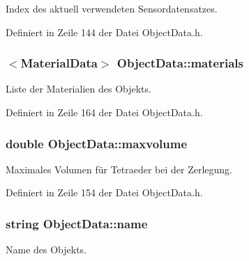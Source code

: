 Index des aktuell verwendeten Sensordatensatzes. 



Definiert in Zeile 144 der Datei Object\-Data.\-h.

\hypertarget{classObjectData_a353002eeb054efed800db1b798d08a6c}{
\subsubsection[{materials}]{$<${\bf Material\-Data}$>$ Object\-Data\-::materials\hspace{0.3cm}{\ttfamily [private]}}}\label{classObjectData_a353002eeb054efed800db1b798d08a6c}


Liste der Materialien des Objekts. 



Definiert in Zeile 164 der Datei Object\-Data.\-h.

\hypertarget{classObjectData_a5cc67da17022ec0f6eed6d02fa975a8b}{
\subsubsection[{maxvolume}]{\setlength{\rightskip}{0pt plus 5cm}double Object\-Data\-::maxvolume\hspace{0.3cm}{\ttfamily [private]}}}\label{classObjectData_a5cc67da17022ec0f6eed6d02fa975a8b}


Maximales Volumen für Tetraeder bei der Zerlegung. 



Definiert in Zeile 154 der Datei Object\-Data.\-h.

\hypertarget{classObjectData_a6d900f11952e9d50e6660a3695fad99d}{
\subsubsection[{name}]{\setlength{\rightskip}{0pt plus 5cm}string Object\-Data\-::name\hspace{0.3cm}{\ttfamily [private]}}}\label{classObjectData_a6d900f11952e9d50e6660a3695fad99d}


Name des Objekts. 



